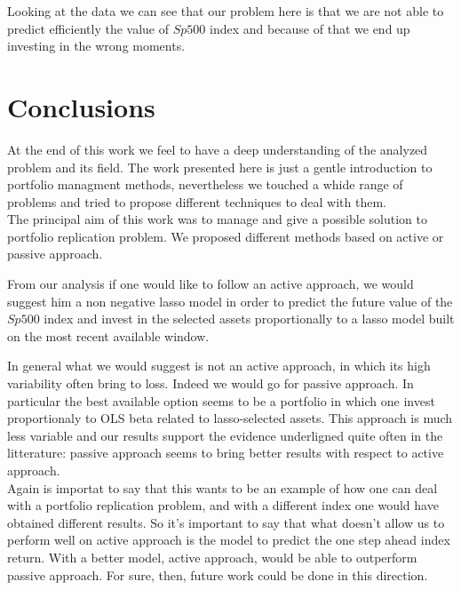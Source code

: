 \documentclass{article}%
\begin{document}
Looking at the data we can see that our problem here is that we are not able to predict efficiently the value of $Sp500$ index and because of that we end up investing in the wrong moments.


\newpage

\section{Conclusions}

At the end of this work we feel to have a deep understanding of the analyzed problem and its field. The work presented here is just a gentle introduction to portfolio managment methods, nevertheless we touched a whide range of problems and tried to propose different techniques to deal with them.
\\

The principal aim of this work was to manage and give a possible solution to portfolio replication problem. We  proposed different methods based on active or passive approach.

From our analysis if one would like to follow an active approach, we would suggest him a non negative lasso model in order to predict the future value of the $Sp500$ index and invest in the selected assets proportionally to a lasso model built on the most recent available window.

In general what we would suggest is not an active approach, in which its high variability often bring to loss. Indeed we would go for passive approach. In particular the best available option seems to be a portfolio in which one invest proportionaly to OLS beta related to lasso-selected assets.
This approach is much less variable and our results support the evidence underligned quite often in the litterature: passive approach seems to bring better results with respect to active approach.
\\

Again is importat to say that this wants to be an example of how one can deal with a portfolio replication problem, and with a different index one would have obtained different results. So it's important to say that what doesn't allow us to perform well on active approach is the model to predict the one step ahead index return. With a better model, active approach, would be able to outperform passive approach. For sure, then, future work could be done in this direction.
\end{document}
